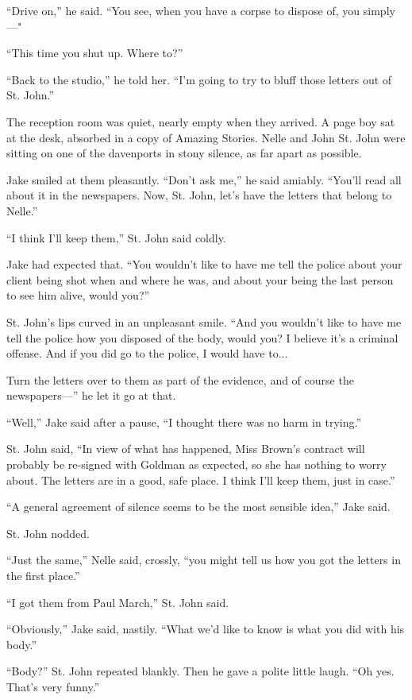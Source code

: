 \documentclass{novel}
\begin{document}
“Drive on,” he said. “You see, when you have a corpse to dispose of, you simply—"

“This time you shut up. Where to?”

“Back to the studio,” he told her. “I’m going to try to bluff those letters out of St. John.”

The reception room was quiet, nearly empty when they arrived. A page boy sat at the desk, absorbed in a copy of Amazing Stories. Nelle and John St. John were sitting on one of the davenports in stony silence, as far apart as possible.

Jake smiled at them pleasantly. “Don’t ask me,” he said amiably. “You’ll read all about it in the newspapers. Now, St. John, let’s have the letters that belong to Nelle.”

“I think I’ll keep them,” St. John said coldly.

Jake had expected that. “You wouldn’t like to have me tell the police about your client being shot when and where he was, and about your being the last person to see him alive, would you?”

St. John’s lips curved in an unpleasant smile. “And you wouldn’t like to have me tell the police how you disposed of the body, would you? I believe it’s a criminal offense. And if you did go to the police, I would have to...

Turn the letters over to them as part of the evidence, and of course the newspapers—” he let it go at that.

“Well,” Jake said after a pause, “I thought there was no harm in trying.”

St. John said, “In view of what has happened, Miss Brown’s contract will probably be re-signed with Goldman as expected, so she has nothing to worry about. The letters are in a good, safe place. I think I’ll keep them, just in case.”

“A general agreement of silence seems to be the most sensible idea,” Jake said.

St. John nodded.

“Just the same,” Nelle said, crossly, “you might tell us how you got the letters in the first place.”

“I got them from Paul March,” St. John said.

“Obviously,” Jake said, nastily. “What we’d like to know is what you did with his body.”

“Body?” St. John repeated blankly. Then he gave a polite little laugh. “Oh yes. That’s very funny.”
\end{document}
